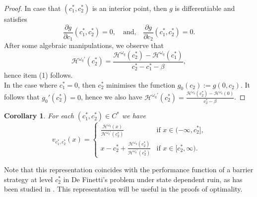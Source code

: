 \documentclass[10pt,a4paper]{amsart}
\newtheorem{corollary}{Corollary}[section]
\newcommand{\cH}{\mathcal{H}}
\newcommand{\homega}{\omega_q}
\begin{document}
\begin{proof}
	In case that $(c_1^\ast,c_2^\ast)$ is an interior point, then $g$ is differentiable and satisfies
	\[
	\frac{\partial g}{\partial c_1}(c_1^\ast,c_2^\ast) = 0, \quad\text{and,}\quad \frac{\partial g}{\partial c_2}(c_1^\ast,c_2^\ast)=0.
	\]
	After some algebraic manipulations, we observe that
	\[
	\cH^{\homega\prime}(c_2^\ast) = \frac{\cH^{\homega}(c_2^\ast) - \cH^{\homega}(c_1^\ast)}{c_2^\ast-c_1^\ast-\beta},
	\]
	hence item (1) follows.\\
	In the case where $c_1^\ast=0$, then $c_2^\ast$ minimises the function $g_0(c_2):= g(0,c_2)$. It follows that $g_0'(c_2^\ast)=0$, hence we also have $\cH^{\homega\prime}(c_2^\ast) = \frac{\cH^{\homega}(c_2^\ast) - \cH^{\homega}(0)}{c_2^\ast-\beta}$.
\end{proof}
\begin{corollary}\label{cor_definetti}
	For each $(c_1^\ast,c_2^\ast)\in C^\ast$ we have
	\[
	v_{c_1^\ast,c_2^\ast}(x) = \begin{cases}
		 \frac{\cH^{\homega}(x)}{\cH^{\homega\prime}(c_2^\ast)} & \text{if $x \in (-\infty,c_2^\ast]$,} \\
		x-c_2^\ast + \frac{\cH^{\homega}(c_2^\ast)}{\cH^{\homega\prime}(c_2^\ast)} & \text{if $x \in [c_2^\ast, \infty)$.}
	\end{cases}
	\]
\end{corollary}
Note that this representation coincides with the performance function of a barrier strategy at level $c_2^\ast$ in De Finetti's problem under state dependent ruin, as has been studied in \cite{mata-renaud_2024}. This representation will be useful in the proofs of optimality.
\end{document}

